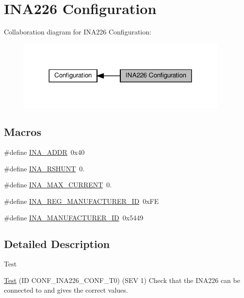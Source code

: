 \hypertarget{group__defines__ina226__configuration}{}\section{I\+N\+A226 Configuration}
\label{group__defines__ina226__configuration}
Collaboration diagram for I\+N\+A226 Configuration\+:
\nopagebreak
\begin{figure}[H]
\begin{center}
\leavevmode
\includegraphics[width=300pt]{group__defines__ina226__configuration}
\end{center}
\end{figure}
\subsection*{Macros}
\begin{DoxyCompactItemize}
\item 
\#define \hyperlink{group__defines__ina226__configuration_gad742a86ac5089cdfc6bb385de8dae4de}{I\+N\+A\+\_\+\+A\+D\+DR}~0x40
\item 
\#define \hyperlink{group__defines__ina226__configuration_gae50e821d99cc5d3696877fd921049ea3}{I\+N\+A\+\_\+\+R\+S\+H\+U\+NT}~0.
\item 
\#define \hyperlink{group__defines__ina226__configuration_ga30ad8caf4e8a6f008591d8a6e2ec6d9c}{I\+N\+A\+\_\+\+M\+A\+X\+\_\+\+C\+U\+R\+R\+E\+NT}~0.
\item 
\#define \hyperlink{group__defines__ina226__configuration_ga03a691e35444e414c3256b234ec19abf}{I\+N\+A\+\_\+\+R\+E\+G\+\_\+\+M\+A\+N\+U\+F\+A\+C\+T\+U\+R\+E\+R\+\_\+\+ID}~0x\+FE
\item 
\#define \hyperlink{group__defines__ina226__configuration_gaa5387a1fef1c3a301c558d631851456a}{I\+N\+A\+\_\+\+M\+A\+N\+U\+F\+A\+C\+T\+U\+R\+E\+R\+\_\+\+ID}~0x5449
\end{DoxyCompactItemize}


\subsection{Detailed Description}
\begin{DoxyRefDesc}{Test}
\item[\hyperlink{test__test000019}{Test}](ID C\+O\+N\+F\+\_\+\+I\+N\+A226\+\_\+\+C\+O\+N\+F\+\_\+\+T0) (S\+EV 1) Check that the I\+N\+A226 can be connected to and gives the correct values.\end{DoxyRefDesc}


